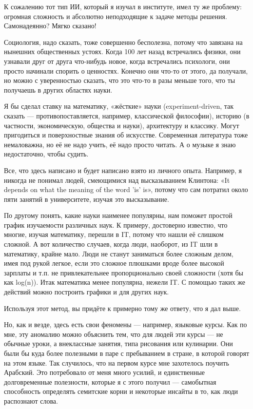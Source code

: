 \documentclass[ebook,12pt,oneside,openany]{memoir}
\begin{document}
К сожалению тот тип ИИ, который я изучал в институте, имел ту же
проблему: огромная сложность и абсолютно неподходящие к задаче методы
решения. Самонадеянно? Мягко сказано!

Социология, надо сказать, тоже совершенно бесполезна, потому что
завязана на нынешних общественных устоях. Когда 100 лет назад
встречались физики, они узнавали друг от друга что-нибудь новое, когда
встречались психологи, они просто начинали спорить о ценностях.
Конечно они что-то от этого, да получали, но можно с уверенностью
сказать, что это что-то в разы меньше того, что ты получаешь в других
областях науки.

Я бы сделал ставку на математику, «жёсткие» науки (experiment-driven,
так сказать — противопоставляется, например, классической философии),
историю (в частности, экономическую, общества и науки), архитектуру и
классику. Могут пригодиться и поверхностные знания об искусстве.
Современная литература тоже немаловажна, но её не надо учить, её надо
просто читать. А о музыке я знаю недостаточно, чтобы судить.

Все, что здесь написано и будет написано взято из личного опыта.
Например, я никогда не понимал людей, смеющимися над высказыванием
Клинтона: «It depends on what the meaning of the word 'is' is», потому
что сам потратил около пяти занятий в университете, изучая это
высказывание.

По другому понять, какие науки наименее популярны, нам поможет простой
график изучаемости различных наук. К примеру, достоверно известно, что
многие, изучая математику, перешли в IT, потому что нашли её слишком
сложной. А вот количество случаев, когда люди, наоборот, из IT шли в
математику, крайне мало. Люди не станут заниматься более сложным
делом, имея под рукой легкое, если это сложное плюшками вроде более
высокой зарплаты и т.п. не привлекательнее пропорционально своей
сложности (хотя бы как log(n)). Итак математика менее популярна,
нежели IT. С помощью таких же действий можно построить графики и для
других наук.

Используя этот метод, вы придёте к примерно тому же ответу, что я дал
выше.

Но, как и везде, здесь есть свои феномены — например, языковые курсы.
Как по мне, эту аномалию можно объяснить тем, что для людей эти курсы
— не обычные уроки, а внеклассные занятия, типа рисования или
кулинарии. Они были бы куда более полезными в паре с пребыванием в
стране, в которой говорят на этом языке. Так случилось, что на первом
курсе мне захотелось поучить Арабский. Это потребовало от меня много
усилий, и единственные долговременные полезности, которые я с этого
получил — самобытная способность определять семитские корни и
некоторые инсайты в то, как люди распознают слова.
\end{document}
